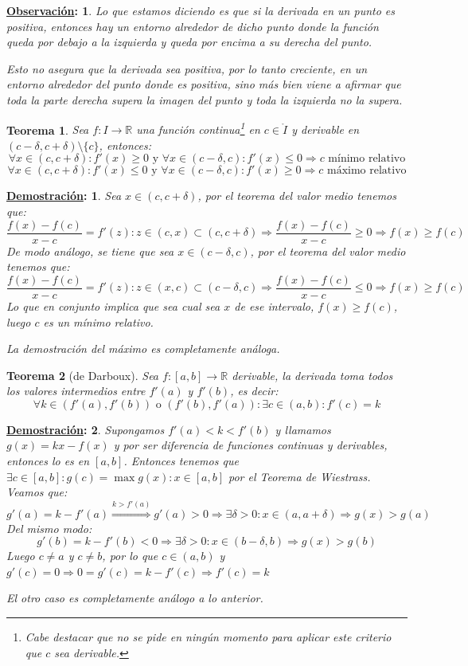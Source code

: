 \documentclass[10pt,a4paper,openright]{book}
\theoremstyle{break}
\newtheorem*{theo}{Teorema}
\newtheorem*{demo}{\underline{Demostración}:}
\newtheorem*{obs}{\underline{Observación}:}
\begin{document}
\begin{obs}
Lo que estamos diciendo es que si la derivada en un punto es positiva, entonces hay un entorno alrededor de dicho punto donde la función queda por debajo a la izquierda y queda por encima a su derecha del punto.

Esto no asegura que la derivada sea positiva, por lo tanto creciente, en un entorno alrededor del punto donde es positiva, sino más bien viene a afirmar que toda la parte derecha supera la imagen del punto y toda la izquierda no la supera.
\end{obs}

\begin{theo}
Sea $f:I\rightarrow \mathbb R$ una función continua\footnote{Cabe destacar que no se pide en ningún momento para aplicar este criterio que $c$ sea derivable.} en $c\in \mathring{I}$ y derivable en $(c-\delta,c+\delta)\setminus\{c\}$, entonces:
$$\forall x\in (c, c+\delta): f'(x)\geq 0 \mbox{ y } \forall x\in (c-\delta, c) : f'(x)\leq 0\Rightarrow c\mbox{ mínimo relativo}$$
$$\forall x\in (c, c+\delta) : f'(x)\leq 0 \mbox{ y } \forall x\in (c-\delta,c) : f'(x)\geq 0\Rightarrow c\mbox{ máximo relativo}$$
\end{theo}
\begin{demo}
Sea $x\in (c,c+\delta)$, por el teorema del valor medio tenemos que:
$$\frac{f(x)-f(c)}{x-c}=f'(z): z\in (c,x)\subset (c,c+\delta)\Rightarrow \frac{f(x)-f(c)}{x-c}\geq 0\Rightarrow f(x)\geq f(c)$$
De modo análogo, se tiene que sea $x\in (c-\delta,c)$, por el teorema del valor medio tenemos que:
$$\frac{f(x)-f(c)}{x-c}=f'(z): z\in (x,c)\subset (c-\delta,c)\Rightarrow \frac{f(x)-f(c)}{x-c}\leq 0\Rightarrow f(x)\geq f(c)$$
Lo que en conjunto implica que sea cual sea $x$ de ese intervalo, $f(x)\geq f(c)$, luego $c$ es un mínimo relativo.

La demostración del máximo es completamente análoga.
\end{demo}

\begin{theo}[de Darboux]
Sea $f:[a,b]\rightarrow \mathbb R$ derivable, la derivada toma todos los valores intermedios entre $f'(a)$ y $f'(b)$, es decir:
$$\forall k\in (f'(a), f'(b)) \mbox{ o } (f'(b), f'(a)): \exists c\in (a,b): f'(c)=k$$
\end{theo}

\begin{demo}
Supongamos $f'(a)<k<f'(b)$ y llamamos $g(x)=kx-f(x)$ y por ser diferencia de funciones continuas y derivables, entonces lo es en $[a,b]$. Entonces tenemos que $\exists c \in [a,b]: g(c)=\max{g(x)}: x\in [a,b]$ por el Teorema de Wiestrass. Veamos que:
$$g'(a)=k-f'(a)\stackrel{k>f'(a)}{\Rightarrow}g'(a)>0\Rightarrow \exists \delta>0: x\in (a, a+\delta)\Rightarrow g(x)>g(a)$$
Del mismo modo:
$$g'(b)=k-f'(b)<0\Rightarrow\exists \delta>0 : x\in (b-\delta, b)\Rightarrow g(x)>g(b)$$
Luego $c\neq a$ y $c\neq b$, por lo que $c\in (a,b)$ y $g'(c)=0\Rightarrow 0=g'(c)=k-f'(c)\Rightarrow f'(c)=k$

El otro caso es completamente análogo a lo anterior.
\end{demo}
\end{document}
